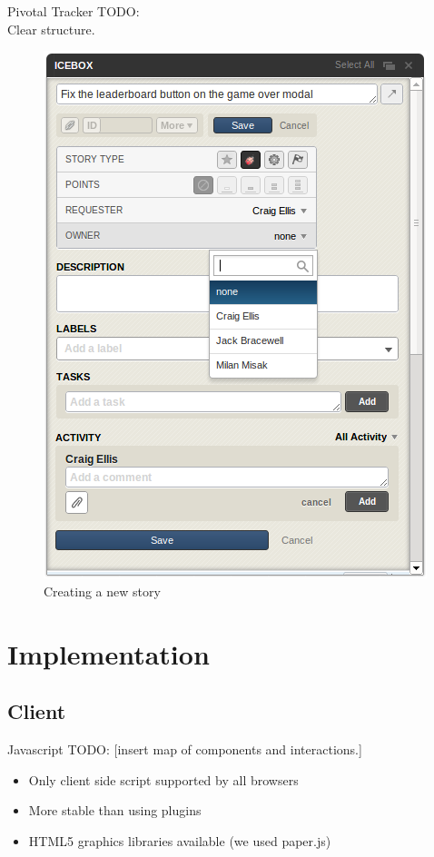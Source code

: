 \documentclass{beamer}
\begin{document}
\begin{frame}{Pivotal Tracker}
  TODO:\\
  Clear structure.\\
  \begin{figure}[hb]
    \centering
    \includegraphics[scale=0.25]{pivotal_new_story.png}
    \caption{Creating a new story}
  \end{figure}
\end{frame}


\section{Implementation}
\subsection{Client}

\begin{frame}{Javascript}
  TODO:
  [insert map of components and interactions.]
  \begin{itemize}
    \item Only client side script supported by all browsers
    \item More stable than using plugins
    \item HTML5 graphics libraries available (we used paper.js)
  \end{itemize}
\end{frame}
\end{document}
